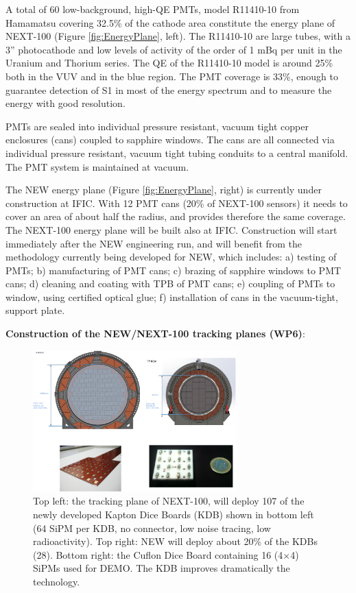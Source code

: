 A total of 60 low-background, high-QE PMTs, model R11410-10 from Hamamatsu covering 32.5\% of the cathode area constitute the energy plane of NEXT-100 (Figure \ref{fig:EnergyPlane}, left). The R11410-10 are large tubes, with a 3'' photocathode and low levels of  activity of the order of 1 mBq per unit in the Uranium and Thorium series. The QE of the R11410-10 model is around 25\% both in the VUV and in the blue region. The  PMT coverage is 33\%, enough to guarantee detection of S1 in most of the energy spectrum and to measure the energy with good resolution.

PMTs are sealed into individual pressure resistant, vacuum tight copper enclosures (cans) coupled to 
sapphire windows. The cans are all connected via individual pressure resistant, vacuum tight tubing conduits to a central manifold. The PMT system is maintained at vacuum.

The NEW energy plane (Figure \ref{fig:EnergyPlane}, right) is currently under construction at IFIC. With 12 PMT cans (20\% of NEXT-100 sensors) it needs to cover an area of about half the radius, and provides therefore the same coverage. The NEXT-100 energy plane will be built also at IFIC. Construction will start immediately after the NEW engineering run, and will benefit from the methodology currently being developed for NEW, which includes: a) testing of PMTs; b) manufacturing of PMT cans; c) brazing of sapphire windows to PMT cans; d) cleaning and coating with TPB of PMT cans; e) coupling of PMTs to window, using certified optical glue; f) installation of cans in the vacuum-tight, support plate. 

%
 {\bf  Construction of the NEW/NEXT-100 tracking planes (WP6)}:

\begin{figure}[tbhp!]
\begin{center}
\includegraphics[width=0.7\textwidth]{img/TPNext-100.png}
\end{center}
\caption{Top left: the tracking plane of NEXT-100, will deploy 107 of the newly developed Kapton Dice Boards (KDB) shown in bottom left (64 SiPM per KDB, no connector, low noise tracing, low radioactivity). Top right: NEW will deploy about 20\% of the KDBs (28). Bottom right: the Cuflon Dice Board containing 16 (4$\times$4) SiPMs used for DEMO. The KDB improves dramatically the technology.} 
\label{fig.db2}
\end{figure}

